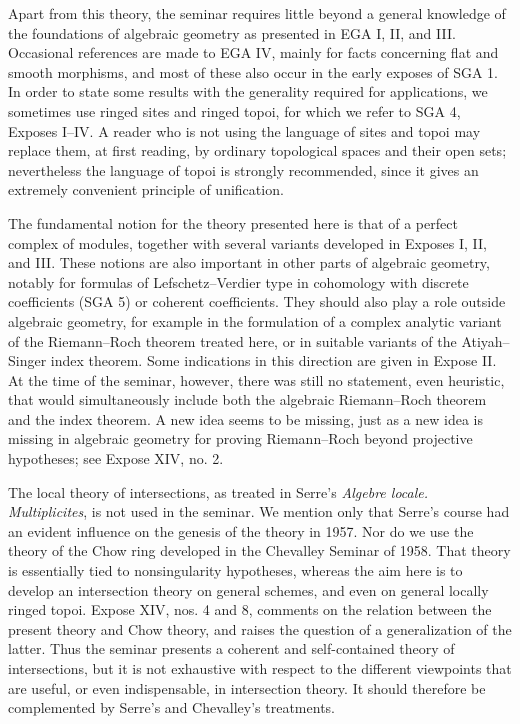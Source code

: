 \documentclass[11pt]{article}
\theoremstyle{plain}
\theoremstyle{definition}
\theoremstyle{remark}
\begin{document}
Apart from this theory, the seminar requires little beyond a general knowledge of the foundations of algebraic geometry as presented in EGA I, II, and III. Occasional references are made to EGA IV, mainly for facts concerning flat and smooth morphisms, and most of these also occur in the early exposes of SGA 1. In order to state some results with the generality required for applications, we sometimes use ringed sites and ringed topoi, for which we refer to SGA 4, Exposes I--IV. A reader who is not using the language of sites and topoi may replace them, at first reading, by ordinary topological spaces and their open sets; nevertheless the language of topoi is strongly recommended, since it gives an extremely convenient principle of unification.

The fundamental notion for the theory presented here is that of a perfect complex of modules, together with several variants developed in Exposes I, II, and III. These notions are also important in other parts of algebraic geometry, notably for formulas of Lefschetz--Verdier type in cohomology with discrete coefficients (SGA 5) or coherent coefficients. They should also play a role outside algebraic geometry, for example in the formulation of a complex analytic variant of the Riemann--Roch theorem treated here, or in suitable variants of the Atiyah--Singer index theorem. Some indications in this direction are given in Expose II. At the time of the seminar, however, there was still no statement, even heuristic, that would simultaneously include both the algebraic Riemann--Roch theorem and the index theorem. A new idea seems to be missing, just as a new idea is missing in algebraic geometry for proving Riemann--Roch beyond projective hypotheses; see Expose XIV, no. 2.

The local theory of intersections, as treated in Serre's \emph{Algebre locale. Multiplicites}, is not used in the seminar. We mention only that Serre's course had an evident influence on the genesis of the theory in 1957. Nor do we use the theory of the Chow ring developed in the Chevalley Seminar of 1958. That theory is essentially tied to nonsingularity hypotheses, whereas the aim here is to develop an intersection theory on general schemes, and even on general locally ringed topoi. Expose XIV, nos. 4 and 8, comments on the relation between the present theory and Chow theory, and raises the question of a generalization of the latter. Thus the seminar presents a coherent and self-contained theory of intersections, but it is not exhaustive with respect to the different viewpoints that are useful, or even indispensable, in intersection theory. It should therefore be complemented by Serre's and Chevalley's treatments.
\end{document}
